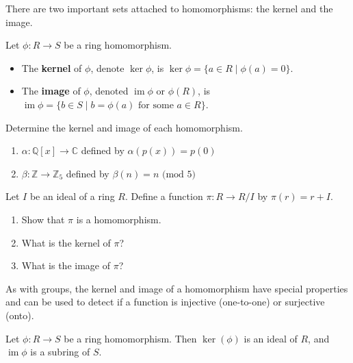 There are two  important sets attached to homomorphisms: the kernel and the image.

\begin{definition}
Let $\phi:R\to S$ be a ring homomorphism. 
\begin{itemize}
\item The \textbf{kernel} of $\phi$, denote $\ker \phi$, is $\ker \phi=\{a\in R\mid \phi(a)=0\}$. 
\item The \textbf{image} of $\phi$, denoted  $\operatorname{im}\phi$ or  $\phi(R)$, is $\operatorname{im}\phi=\{b\in S\mid b=\phi(a) \text{ for some $a\in R$}\}$.
\end{itemize}
\end{definition}

\begin{problem}\label{prob.KernelImageConcrete}
Determine the kernel and image of each homomorphism.
\begin{enumerate}
\item $\alpha: \mathbb{Q}[x] \rightarrow \mathbb{C}$ defined by $\alpha(p(x)) = p(0)$
\item $\beta: \mathbb{Z} \rightarrow \mathbb{Z}_5$ defined by $\beta(n) = n \text{ (mod $5$)}$
\end{enumerate}
\end{problem}

\begin{problem}\label{prob.NaturalProjection}
Let $I$ be an ideal of a ring $R$. Define a function $\pi:R \rightarrow R/I$ by $\pi(r) = r+I$.
\begin{enumerate}
\item Show that $\pi$ is a homomorphism. %
\item What is the kernel of $\pi$?
\item What is the image of $\pi$?
\end{enumerate}
\end{problem}

As with groups, the kernel and image of a homomorphism have special properties and can be used to detect if a function is injective (one-to-one) or surjective (onto).

\begin{theorem}\label{thm.KernelIsIdealImageIsSubring}
Let $\phi:R\to S$ be a ring homomorphism. Then $\ker(\phi)$ is an ideal of $R$, and $\operatorname{im}\phi$ is a subring of $S$.
\end{theorem}

